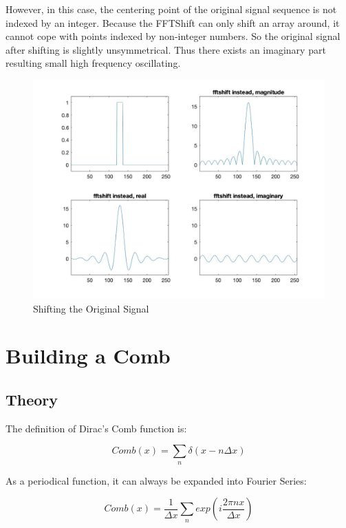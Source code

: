 \documentclass[11pt,a4paper,BCOR12mm, headexclude, footexclude, twoside, openright]{scrartcl}
\numberwithin{equation}{section} %
\numberwithin{figure}{section} %
\numberwithin{table}{section} %
\begin{document}
However, in this case, the centering point of the original signal sequence is not indexed by an integer. Because the FFTShift can only shift an array around, it cannot cope with points indexed by non-integer numbers. So the original signal after shifting is slightly unsymmetrical. Thus there exists an imaginary part resulting small high frequency oscillating. 

\begin{figure}[h!]
\centering
\includegraphics[scale=0.35]{2-4.jpg}
\caption{Shifting the Original Signal}
\end{figure}




\newpage



\section{Building a Comb}
\subsection{Theory}

The definition of Dirac's Comb function is:

\begin{equation}
    Comb(x) = \sum_{n} \delta(x - n \Delta x)
\end{equation}

As a periodical function, it can always be expanded into Fourier Series:

\begin{equation}
    Comb(x) = \frac{1}{\Delta x} \sum_{n} exp(i \frac{2 \pi n x}{\Delta x})
\end{equation}
\end{document}
